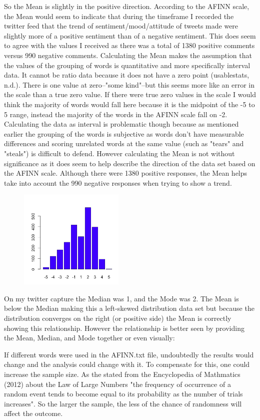 \documentclass[10pt]{article}
\begin{document}
So the Mean is slightly in the positive direction. According to the AFINN scale, the Mean would seem to indicate that during the timeframe I recorded the twitter feed that the trend of sentiment/mood/attitude of tweets made were slightly more of a positive sentiment than of a negative sentiment. This does seem to agree with the values I received as there was a total of 1380 positive comments versus 990 negative comments. Calculating the Mean makes the assumption that the values of the grouping of words is quantitative and more specifically interval data. It cannot be ratio data because it does not have a zero point (usablestats, n.d.). There is one value at zero--"some kind"--but this seems more like an error in the scale than a true zero value. If there were true zero values in the scale I would think the majority of words would fall here because it is the midpoint of the -5 to 5 range, instead the majority of the words in the AFINN scale fall on -2. 
Calculating the data as interval is problematic though because as mentioned earlier the grouping of the words is subjective as words don't have measurable differences and scoring unrelated words at the same value (such as "tears" and "steals") is difficult to defend. However calculating the Mean is not without significance as it does seem to help describe the direction of the data set based on the AFINN scale. Although there were 1380 positive responses, the Mean helps take into account the 990 negative responses when trying to show a trend.\begin{figure}
\includegraphics[width=5cm, scale=0.3]{barplot_week3.png}
\end{figure} On my twitter capture the Median was 1, and the Mode was 2. The Mean is below the Median making this a left-skewed distribution data set but because the distribution converges on the right (or positive side) the Mean is correctly showing this relationship. However the relationship is better seen by providing the Mean, Median, and Mode together or even visually:

If different words were used in the AFINN.txt file, undoubtedly the results would change and the analysis could change with it. To compensate for this, one could increase the sample size. As the stated from the Encyclopedia of Mathmatics (2012) about the Law of Large Numbers "the frequency of occurrence of a random event tends to become equal to its probability as the number of trials increases". So the larger the sample, the less of the chance of randomness will affect the outcome.
\end{document}
